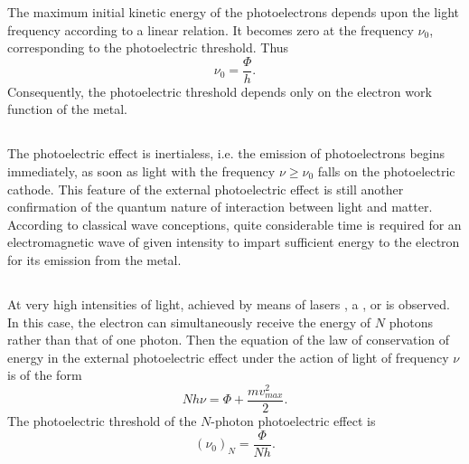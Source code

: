 The maximum initial kinetic energy of the photoelectrons depends upon the light frequency according to a linear relation. It becomes zero at the frequency $\nu_{0}$, corresponding to the photoelectric threshold. Thus
\begin{equation*}%
\nu_{0} = \frac{\Phi}{h}.
\end{equation*}
Consequently, the photoelectric threshold depends only on the
electron work function of the metal.

\subsection{}\label{37.1.6} The photoelectric effect is inertialess, i.e. the emission of photoelectrons begins immediately, as soon as light with the frequency $\nu \geqslant \nu_{0}$ falls on the photoelectric cathode. This feature of the external photoelectric effect is still another confirmation of the quantum nature of interaction between light and matter. According to classical wave conceptions, quite considerable time is required for an electromagnetic wave of given intensity to impart sufficient energy to the electron for its emission from the metal.

\subsection{}\label{37.1.7} At very high intensities of light, achieved by means of lasers , a , or  is observed. In this case, the electron can simultaneously receive the energy of $N$ photons rather than that of one photon. Then the equation of the law of conservation of energy in the external photoelectric effect under the action of light of frequency
$\nu$ is of the form
\begin{equation*}%
N h \nu = \Phi + \frac{mv^{2}_{max}}{2}.
\end{equation*}
The photoelectric threshold of the $N$-photon photoelectric effect is
\begin{equation*}%
(\nu_{0})_{N} = \frac{\Phi}{Nh}.
\end{equation*}


